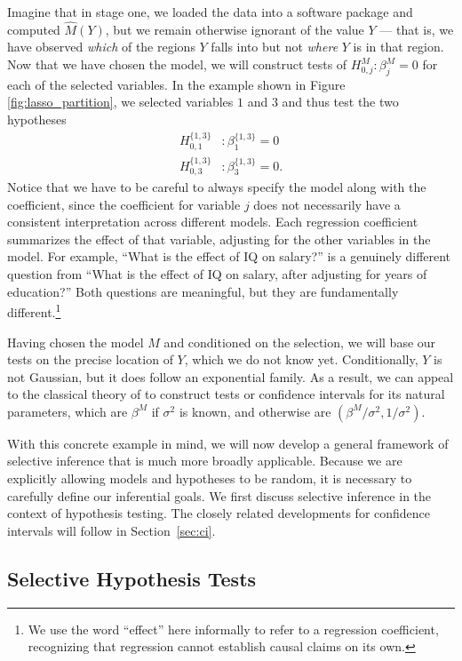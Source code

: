 \documentclass{article}
\theoremstyle{definition}
\newcommand{\hM}{\widehat{M}}
\begin{document}
Imagine that in stage one, we loaded the data into a software package and computed $\hM(Y)$, but we remain otherwise ignorant of the value $Y$ --- that is, we have observed {\em which} of the regions $Y$ falls into but not {\em where} $Y$ is in that region. Now that we have chosen the model, we will construct tests of $H_{0,j}^M: \beta^M_j = 0$ for each of the selected variables. In the example shown in Figure \ref{fig:lasso_partition}, we selected variables $1$ and $3$ and thus test the two hypotheses
\begin{align*}
H^{\{1, 3\}}_{0, 1}&: \beta^{\{1, 3\}}_1 = 0 \\
H^{\{1, 3\}}_{0, 3}&: \beta^{\{1, 3\}}_3 = 0.
\end{align*}
Notice that we have to be careful to always specify the model along with the coefficient, since the coefficient for variable $j$ does not necessarily have a consistent interpretation across different models. Each regression coefficient summarizes the effect of that variable, adjusting for the other variables in the model. For example, ``What is the effect of IQ on salary?'' is a genuinely different question from ``What is the effect of IQ on salary, after adjusting for years of education?''  Both questions are meaningful, but they are fundamentally different.\footnote{We use the word ``effect'' here informally to refer to a regression coefficient, recognizing that regression cannot establish causal claims on its own.}

Having chosen the model $M$ and conditioned on the selection, we will base our tests on the precise location of $Y$, which we do not know yet. Conditionally, $Y$ is not Gaussian, but it does follow an exponential family. As a result, we can appeal to the classical theory of \citet{lehmann1955completeness} to construct tests or confidence intervals for its natural parameters, which are $\beta^M$ if $\sigma^2$ is known, and otherwise are $(\beta^M/\sigma^2,1/\sigma^2)$.

With this concrete example in mind, we will now develop a general framework of selective inference that is much more broadly applicable.
Because we are explicitly allowing models and hypotheses to be random, it is necessary to carefully define our inferential goals.
We first discuss selective inference in the context of hypothesis testing. The closely related developments for confidence intervals will follow in Section~\ref{sec:ci}.

\subsection{Selective Hypothesis Tests}\label{sec:setting}
\end{document}
